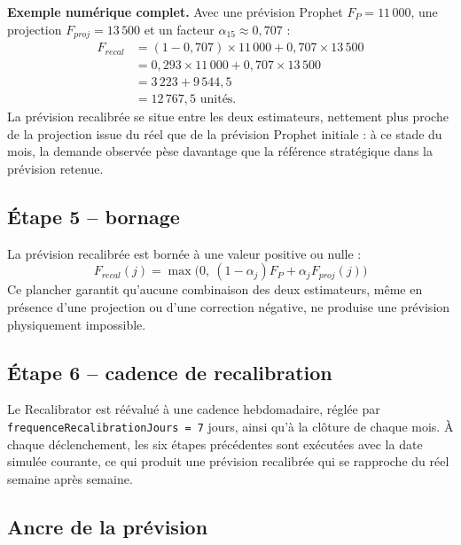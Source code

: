 \documentclass[11pt,a4paper]{article}
\newcommand{\code}[1]{\texttt{#1}}
\begin{document}
\textbf{Exemple numérique complet.} Avec une prévision Prophet \(F_P=11\,000\), une projection \(F_{proj}=13\,500\) et un facteur \(\alpha_{15}\approx0{,}707\) :
\begin{align*}
F_{recal} &= (1-0{,}707)\times 11\,000 + 0{,}707\times 13\,500 \\
&= 0{,}293\times 11\,000 + 0{,}707\times 13\,500 \\
&= 3\,223 + 9\,544{,}5 \\
&= 12\,767{,}5 \text{ unités.}
\end{align*}
La prévision recalibrée se situe entre les deux estimateurs, nettement plus proche de la projection issue du réel que de la prévision Prophet initiale : à ce stade du mois, la demande observée pèse davantage que la référence stratégique dans la prévision retenue.

\subsection{Étape 5 -- bornage}

La prévision recalibrée est bornée à une valeur positive ou nulle :
\[
F_{recal}(j) = \max\big(0,\ (1-\alpha_j)F_P + \alpha_j F_{proj}(j)\big)
\]
Ce plancher garantit qu'aucune combinaison des deux estimateurs, même en présence d'une projection ou d'une correction négative, ne produise une prévision physiquement impossible.

\subsection{Étape 6 -- cadence de recalibration}

Le Recalibrator est réévalué à une cadence hebdomadaire, réglée par \code{frequenceRecalibrationJours = 7} jours, ainsi qu'à la clôture de chaque mois. À chaque déclenchement, les six étapes précédentes sont exécutées avec la date simulée courante, ce qui produit une prévision recalibrée qui se rapproche du réel semaine après semaine.

\subsection{Ancre de la prévision}
\end{document}

